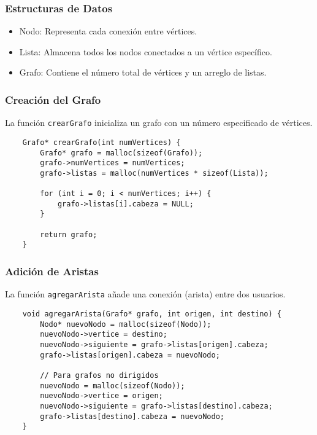 \documentclass[9pt,letterpaper,onecolumn]{rho-class/rho}
\begin{document}
    \subsubsection{Estructuras de Datos}
    \begin{itemize}
        \item Nodo: Representa cada conexión entre vértices.
        \item Lista: Almacena todos los nodos conectados a un vértice específico.
        \item Grafo: Contiene el número total de vértices y un arreglo de listas.
    \end{itemize}

    \subsubsection{Creación del Grafo}
    La función \texttt{crearGrafo} inicializa un grafo con un número especificado de vértices.

    \begin{verbatim}
    Grafo* crearGrafo(int numVertices) {
        Grafo* grafo = malloc(sizeof(Grafo));
        grafo->numVertices = numVertices;
        grafo->listas = malloc(numVertices * sizeof(Lista));

        for (int i = 0; i < numVertices; i++) {
            grafo->listas[i].cabeza = NULL;
        }

        return grafo;
    }
    \end{verbatim}

    \subsubsection{Adición de Aristas}
    La función \texttt{agregarArista} añade una conexión (arista) entre dos usuarios.

    \begin{verbatim}
    void agregarArista(Grafo* grafo, int origen, int destino) {
        Nodo* nuevoNodo = malloc(sizeof(Nodo));
        nuevoNodo->vertice = destino;
        nuevoNodo->siguiente = grafo->listas[origen].cabeza;
        grafo->listas[origen].cabeza = nuevoNodo;

        // Para grafos no dirigidos
        nuevoNodo = malloc(sizeof(Nodo));
        nuevoNodo->vertice = origen;
        nuevoNodo->siguiente = grafo->listas[destino].cabeza;
        grafo->listas[destino].cabeza = nuevoNodo;
    }
    \end{verbatim}
\end{document}
